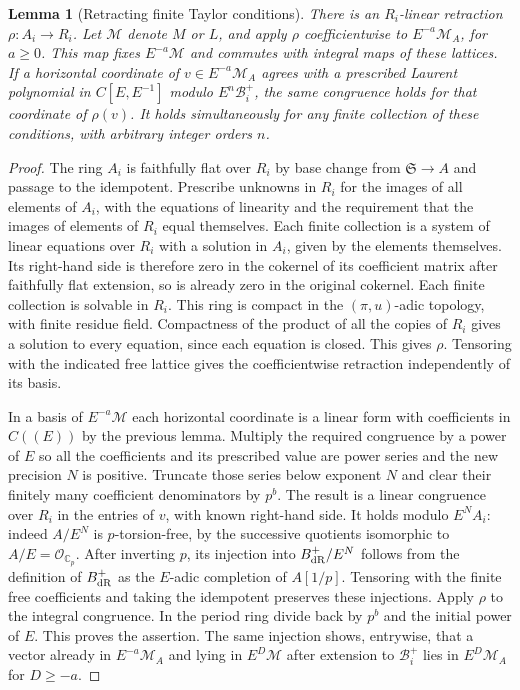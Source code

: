 \documentclass[a4paper,11pt]{article}
\newtheorem{lemma}[proposition]{Lemma}
\theoremstyle{definition}
\theoremstyle{remark}
\numberwithin{equation}{section}
\begin{document}
\begin{lemma}[Retracting finite Taylor conditions]
\leavevmode\label{lem:integraljet767}
There is an \(R_i\)-linear retraction \(\rho:A_i\to R_i\).
Let \(\mathcal M\) denote \(M\) or \(L\), and apply \(\rho\)
coefficientwise to \(E^{-a}\mathcal M_A\), for \(a\ge0\).
This map fixes \(E^{-a}\mathcal M\) and commutes with
integral maps of these lattices. If a horizontal coordinate
of \(v\in E^{-a}\mathcal M_A\) agrees with a prescribed
Laurent polynomial in \(C[E,E^{-1}]\) modulo \(E^n\mathcal B_i^+\),
the same congruence holds for that coordinate of \(\rho(v)\).
It holds simultaneously for any finite collection of these
conditions, with arbitrary integer orders \(n\).
\end{lemma}
\begin{proof}
The ring \(A_i\) is faithfully flat over \(R_i\) by base
change from \(\mathfrak S\to A\) and passage to the
idempotent. Prescribe unknowns in \(R_i\) for the images of
all elements of \(A_i\), with the equations of linearity
and the requirement that the images of elements of \(R_i\)
equal themselves. Each finite collection is a system of
linear equations over \(R_i\) with a solution in \(A_i\),
given by the elements themselves. Its right-hand side is
therefore zero in the cokernel of its coefficient matrix
after faithfully flat extension, so is already zero in
the original cokernel. Each finite collection is solvable
in \(R_i\). This ring is compact in the \((\pi,u)\)-adic
topology, with finite residue field. Compactness of the
product of all the copies of \(R_i\) gives a solution to
every equation, since each equation is closed. This gives
\(\rho\). Tensoring with the indicated free lattice gives
the coefficientwise retraction independently of its basis.

In a basis of \(E^{-a}\mathcal M\) each horizontal coordinate
is a linear form with coefficients in \(C((E))\) by the
previous lemma. Multiply the required congruence by a power
of \(E\) so all the coefficients and its prescribed value
are power series and the new precision \(N\) is positive.
Truncate those series below exponent \(N\) and clear their
finitely many coefficient denominators by \(p^b\). The
result is a linear congruence over \(R_i\) in the entries
of \(v\), with known right-hand side. It holds modulo
\(E^N A_i\): indeed \(A/E^N\) is \(p\)-torsion-free, by
the successive quotients isomorphic to \(A/E=\mathcal O_{\mathbb C_p}\).
After inverting \(p\), its injection into \(B_{\rm dR}^+/E^N\)
follows from the definition of \(B_{\rm dR}^+\) as the
\(E\)-adic completion of \(A[1/p]\). Tensoring with the
finite free coefficients and taking the idempotent preserves
these injections. Apply \(\rho\) to the integral congruence.
In the period ring divide back by \(p^b\) and the initial
power of \(E\). This proves the assertion. The same
injection shows, entrywise, that a vector already in
\(E^{-a}\mathcal M_A\) and lying in \(E^D\mathcal M\)
after extension to \(\mathcal B_i^+\) lies in \(E^D\mathcal M_A\)
for \(D\ge-a\).
\end{proof}
\end{document}

